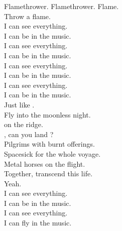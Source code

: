 
Flamethrower. Flamethrower. Flame. \\
Throw a flame. \\

I can see everything. \\
I can be in the music. \\
I can see everything. \\
I can be in the music. \\

I can see everything. \\
I can be in the music. \\
I can see everything. \\
I can be in the music. \\

Just like . \\
Fly into the moonless night. \\
 on the ridge. \\
, can you land ? \\
Pilgrims with burnt offerings. \\
Spacesick for the whole voyage. \\
Metal horses on the flight. \\
Together, transcend this life. \\
Yeah. \\

I can see everything. \\
I can be in the music. \\
I can see everything. \\
I can fly in the music. \\
